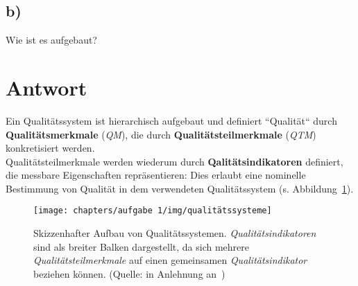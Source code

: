 \subsection*{b)}
Wie ist es aufgebaut?

\section*{Antwort}
Ein Qualitätssystem ist hierarchisch aufgebaut und definiert ``Qualität`` durch \textbf{Qualitätsmerkmale} (\textit{QM}), die durch \textbf{Qualitätsteilmerkmale} (\textit{QTM}) konkretisiert werden.\\
Qualitätsteilmerkmale werden wiederum durch \textbf{Qalitätsindikatoren} definiert, die messbare Eigenschaften repräsentieren: Dies erlaubt eine nominelle Bestimmung von Qualität in dem verwendeten Qualitätssystem (s. Abbildung~\ref{fig:qualitätssysteme}).

\begin{figure}
    \centering
    \texttt{[image: chapters/aufgabe 1/img/qualitätssysteme]}
    \caption{Skizzenhafter Aufbau von Qualitätssystemen. \textit{Qualitätsindikatoren} sind als breiter Balken dargestellt, da sich mehrere \textit{Qualitätsteilmerkmale} auf einen gemeinsamen \textit{Qualitätsindikator} beziehen können. (Quelle: in Anlehnung an~\cite[Abb. 1.1, 3]{Wed09c})}
    \label{fig:qualitätssysteme}
\end{figure}
